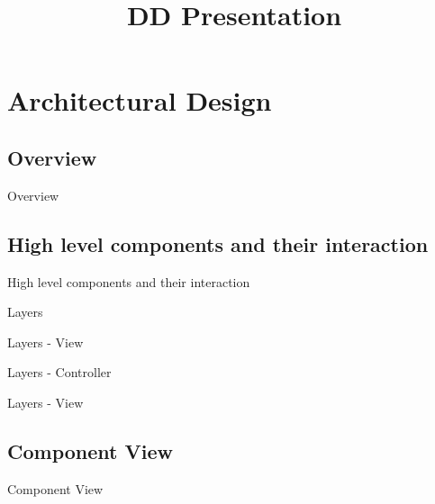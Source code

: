 \documentclass{../common/latex_classes/pdf_presentation}
\title{DD Presentation}
\begin{document}
	\titleToc{}
	\section{Architectural Design}
	
	\subsection{Overview}
	
	\begin{frame}{Overview}
	\end{frame}
	
	\subsection{High level components and their interaction}
	
	\begin{frame}{High level components and their interaction}
	\end{frame}
	
	\begin{frame}{Layers}
	\end{frame}
	
	\begin{frame}{Layers - View}
	\end{frame}
	
	\begin{frame}{Layers - Controller}
	\end{frame}
	
	\begin{frame}{Layers - View}
	\end{frame}
	
	\subsection{Component View}
	
	\begin{frame}{Component View}
	\end{frame}		
	
\end{document}
